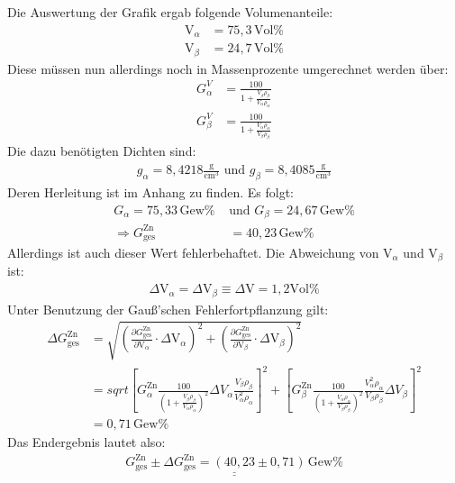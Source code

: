 \documentclass[german,  %
parskip=full,  %
]{scrartcl}
\begin{document}
Die Auswertung der Grafik ergab folgende Volumenanteile:
\begin{align*}
\text{V}_{\alpha} &= 75,3 \, \text{Vol}\% \\
\text{V}_{\beta} &= 24,7 \, \text{Vol}\%
\end{align*}
Diese müssen nun allerdings noch in Massenprozente umgerechnet werden über:
\begin{align*}
G_{\alpha}^{V} &= \frac{100}{1+\frac{V_{\beta}\rho_{\beta}}{V_{\alpha} \rho_{\alpha}}} \\
G_{\beta}^{V} &= \frac{100}{1+\frac{V_{\alpha}\rho_{\alpha}}{V_{\beta} \rho_{\beta}}}
\end{align*}
Die dazu benötigten Dichten sind:
\begin{align}
g_{\alpha} = 8,4218 \frac{\text{g}}{\text{cm}^3} \,\, \text{und} \,\, g_{\beta} = 8,4085 \frac{\text{g}}{\text{cm}^3}
\end{align}
Deren Herleitung ist im Anhang zu finden.
Es folgt:
\begin{align*}
G_{\alpha} = 75,33\, \text{Gew}\% \,\, &\text{und} \,\, G_{\beta} = 24,67\, \text{Gew}\% \\
\Rightarrow G_{\text{ges}}^{\text{Zn}} &= 40,23 \, \text{Gew}\%
\end{align*}
Allerdings ist auch dieser Wert fehlerbehaftet. Die Abweichung von $\text{V}_{\alpha}$ und $\text{V}_{\beta}$ ist:
\begin{align*}
\Delta \text{V}_{\alpha} = \Delta \text{V}_{\beta} \equiv \Delta \text{V} = 1,2\text{Vol}\%
\end{align*}
Unter Benutzung der Gauß'schen Fehlerfortpflanzung gilt:
\begin{align*}
\Delta G_{\text{ges}}^{\text{Zn}} &= \sqrt{\left(\frac{\partial G_{\text{ges}}^{\text{Zn}}}{\partial \text{V}_{\alpha}} \cdot
\Delta \text{V}_{\alpha}\right)^2 + \left(\frac{\partial G_{\text{ges}}^{\text{Zn}}}{\partial \text{V}_{\beta}} \cdot
\Delta \text{V}_{\beta}\right)^2} \\
&= sqrt{\left[G_{\alpha}^{\text{Zn}} \frac{100}{\left(1+\frac{V_{\beta} \rho_{\beta}}{V_{\alpha} \rho_{\alpha}}\right)^2} \Delta V_{\alpha} \frac{V_{\beta} \rho_{\beta}}{V_{\alpha}^2\rho_{\alpha}}\right]^2 + \left[G_{\beta}^{\text{Zn}} \frac{100}{\left(1+\frac{V_{\alpha} \rho_{\alpha}}{V_{\beta} \rho_{\beta}}\right)^2} \frac{V_{\alpha}^2\rho_{\alpha}}{V_{\beta} \rho_{\beta}} \Delta V_{\beta}\right]^2} \\
&= 0,71 \, \text{Gew}\%
\end{align*}
Das Endergebnis lautet also:
\begin{align*}
\underline{\underline{G_{\text{ges}}^{\text{Zn}} \pm \Delta G_{\text{ges}}^{\text{Zn}} = (40,23 \pm 0,71) \, \text{Gew}\%}}
\end{align*}
\end{document}
